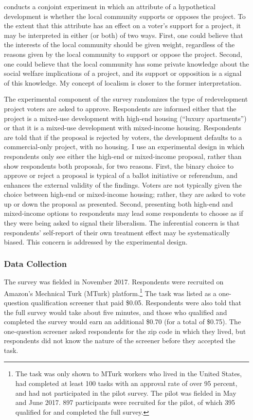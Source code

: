 \documentclass[article,12pt]{memoir}
\begin{document}
\citet{hankinson_when_2018} conducts a conjoint experiment in which an attribute of a hypothetical development is whether the local community supports or opposes the project. To the extent that this attribute has an effect on a voter's support for a project, it may be interpreted in either (or both) of two ways. First, one could believe that the interests of the local community should be given weight, regardless of the reasons given by the local community to support or oppose the project. Second, one could believe that the local community has some private knowledge about the social welfare implications of a project, and its support or opposition is a signal of this knowledge.  My concept of localism is closer to the former interpretation.

The experimental component of the survey randomizes the type of redevelopment project voters are asked to approve.  Respondents are informed either that the project is a mixed-use development with high-end housing (``luxury apartments'') or that it is a mixed-use development with mixed-income housing.  Respondents are told that if the proposal is rejected by voters, the development defaults to a commercial-only project, with no housing.  I use an experimental design in which respondents only see either the high-end or mixed-income proposal, rather than show respondents both proposals, for two reasons. First, the binary choice to approve or reject a proposal is typical of a ballot initiative or referendum, and enhances the external validity of the findings. Voters are not typically given the choice between high-end or mixed-income housing; rather, they are asked to vote up or down the proposal as presented. Second, presenting both high-end and mixed-income options to respondents may lead some respondents to choose as if they were being asked to signal their liberalism.  The inferential concern is that respondents' self-report of their own treatment effect may be systematically biased. This concern is addressed by the experimental design.

\subsubsection{Data Collection}

The survey was fielded in November 2017.  Respondents were recruited on Amazon's Mechnical Turk (MTurk) platform.\footnote{The task was only shown to MTurk workers who lived in the United States, had completed at least 100 tasks with an approval rate of over 95 percent, and had not participated in the pilot survey. The pilot was fielded in May and June 2017. 897 participants were recruited for the pilot, of which 395 qualified for and completed the full survey.}  The task was listed as a one-question qualification screener that paid \$0.05. Respondents were also told that the full survey would take about five minutes, and those who qualified and completed the survey would earn an additional \$0.70 (for a total of \$0.75).  The one-question screener asked respondents for the zip code in which they lived, but respondents did not know the nature of the screener before they accepted the task.
\end{document}

